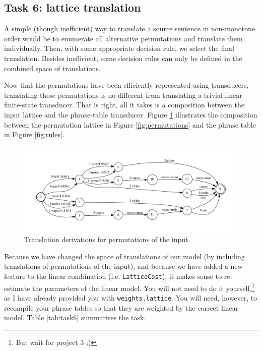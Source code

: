 \subsection{Task 6: lattice translation}

A simple (though inefficient) way to translate a source sentence in non-monotone order would be to enumerate all alternative permutations and translate them individually.
Then, with some appropriate decision rule, we select the final translation.
Besides inefficient, some decision rules can only be defined in the combined space of translations.

Now that the permutations have been efficiently represented using transducers, translating these permutations is no different from translating a trivial linear finite-state transducer.
That is right, all it takes is a composition between the input lattice and the phrase-table transducer.
Figure \ref{fig:non-mono} illustrates the composition between the permutation lattice in Figure \ref{fig:permutations} and the phrase table in Figure \ref{fig:rules}.

\begin{figure}[h]\centering
\includegraphics[scale=0.5]{lattice-nonmonotone.pdf}
\caption{\label{fig:non-mono}Translation derivations for permutations of the input.}
\end{figure}


Because we have changed the space of translations of our model (by including translations of permutations of the input), and because we have added a new feature to the linear combination (i.e. \texttt{LatticeCost}), it makes sense to re-estimate the parameters of the linear model.
You will not need to do it yourself,\footnote{But wait for project 3 ;)} as I have already provided you with \texttt{weights.lattice}.
You will need, however, to recompile your phrase tables so that they are weighted by the correct linear model.
Table \ref{tab:task6} summarises the task. 




